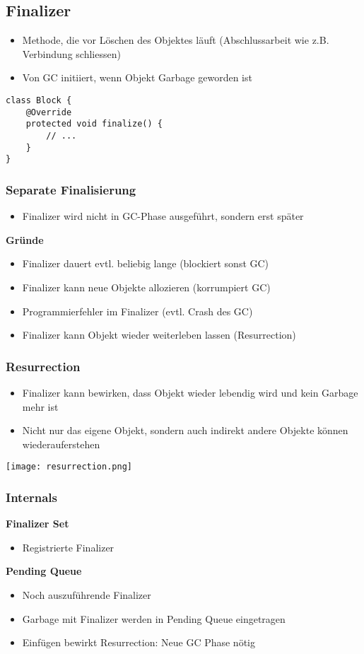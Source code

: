 \subsection{Finalizer}
\begin{itemize}
    \item Methode, die vor Löschen des Objektes läuft (Abschlussarbeit wie z.B. Verbindung schliessen)
    \item Von GC initiiert, wenn Objekt Garbage geworden ist
\end{itemize}
\begin{lstlisting}
class Block {
    @Override 
    protected void finalize() {
        // ...
    }
}
\end{lstlisting}
\subsubsection{Separate Finalisierung}
\begin{itemize}
    \item Finalizer wird nicht in GC-Phase ausgeführt, sondern erst später
\end{itemize}
\textbf{Gründe}
\begin{itemize}
    \item Finalizer dauert evtl. beliebig lange (blockiert sonst GC)
    \item Finalizer kann neue Objekte allozieren (korrumpiert GC)
    \item Programmierfehler im Finalizer (evtl. Crash des GC)
    \item Finalizer kann Objekt wieder weiterleben lassen (Resurrection)
\end{itemize}

\subsubsection{Resurrection}
\begin{itemize}
    \item Finalizer kann bewirken, dass Objekt wieder lebendig wird und kein Garbage mehr ist
    \item Nicht nur das eigene Objekt, sondern auch indirekt andere Objekte können wiederauferstehen
\end{itemize}
\texttt{[image: resurrection.png]}

\subsubsection{Internals}
\textbf{Finalizer Set}
\begin{itemize}
    \item Registrierte Finalizer
\end{itemize}
\textbf{Pending Queue}
\begin{itemize}
    \item Noch auszuführende Finalizer
    \item Garbage mit Finalizer werden in Pending Queue eingetragen
    \item Einfügen bewirkt Resurrection: Neue GC Phase nötig
\end{itemize}

